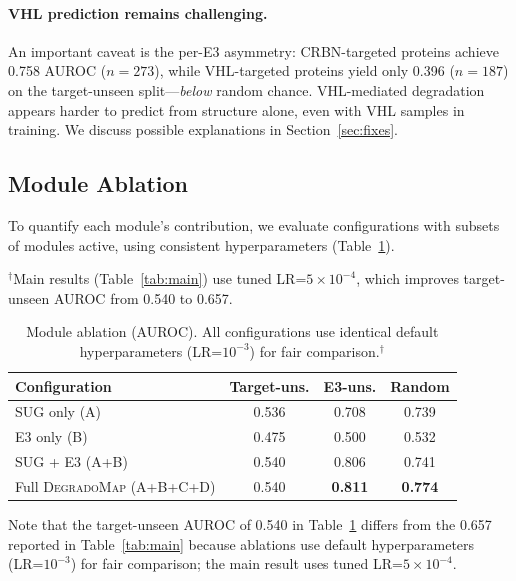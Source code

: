 \documentclass[sigconf]{acmart}
\newcommand{\ours}{\textsc{DegradoMap}}
\begin{document}
\paragraph{VHL prediction remains challenging.}
An important caveat is the per-E3 asymmetry: CRBN-targeted proteins achieve 0.758 AUROC ($n{=}273$), while VHL-targeted proteins yield only 0.396 ($n{=}187$) on the target-unseen split---\emph{below} random chance.
VHL-mediated degradation appears harder to predict from structure alone, even with VHL samples in training.
We discuss possible explanations in Section~\ref{sec:fixes}.

\subsection{Module Ablation}

To quantify each module's contribution, we evaluate configurations with subsets of modules active, using consistent hyperparameters (Table~\ref{tab:module_ablation}).

\begin{table}[!ht]
\centering
\caption{Module ablation (AUROC). All configurations use identical default hyperparameters (LR=$10^{-3}$) for fair comparison.$^\dagger$}
\vspace{-2pt}
\raggedright{\scriptsize $^\dagger$Main results (Table~\ref{tab:main}) use tuned LR=$5\times10^{-4}$, which improves target-unseen AUROC from 0.540 to 0.657.}
\label{tab:module_ablation}
\footnotesize
\setlength{\tabcolsep}{4pt}
\begin{tabular}{@{}lccc@{}}
\toprule
\textbf{Configuration} & \textbf{Target-uns.} & \textbf{E3-uns.} & \textbf{Random} \\
\midrule
SUG only (A) & 0.536 & 0.708 & 0.739 \\
E3 only (B) & 0.475 & 0.500 & 0.532 \\
SUG + E3 (A+B) & 0.540 & 0.806 & 0.741 \\
Full \ours{} (A+B+C+D) & 0.540 & \textbf{0.811} & \textbf{0.774} \\
\bottomrule
\end{tabular}
\end{table}

Note that the target-unseen AUROC of 0.540 in Table~\ref{tab:module_ablation} differs from the 0.657 reported in Table~\ref{tab:main} because ablations use default hyperparameters (LR=$10^{-3}$) for fair comparison; the main result uses tuned LR=$5\times10^{-4}$.
\end{document}
